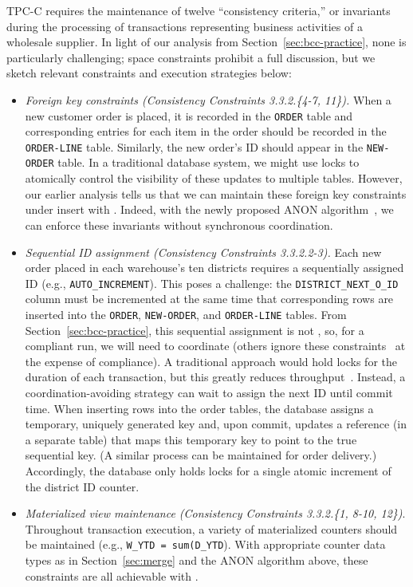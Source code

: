 TPC-C requires the maintenance of twelve ``consistency criteria,'' or
invariants during the processing of transactions representing business
activities of a wholesale supplier. In light of our analysis from
Section~\ref{sec:bcc-practice}, none is particularly challenging;
space constraints prohibit a full discussion, but we sketch relevant
constraints and execution strategies below:
\begin{itemize}

\item \textit{Foreign key constraints (Consistency Constraints
  3.3.2.\{4-7, 11\}).} When a new customer order is placed, it is
  recorded in the \texttt{ORDER} table and corresponding entries for
  each item in the order should be recorded in the \texttt{ORDER-LINE}
  table. Similarly, the new order's ID should appear in the
  \texttt{NEW-ORDER} table. In a traditional database system, we might
  use locks to atomically control the visibility of these updates to
  multiple tables. However, our earlier analysis tells us that we can
  maintain these foreign key constraints under insert with
  \cfreedom. Indeed, with the newly proposed ANON
  algorithm~\cite{ramp-txns}, we can enforce these invariants without
  synchronous coordination.

\item \textit{Sequential ID assignment (Consistency Constraints
  3.3.2.2-3).} Each new order placed in each warehouse's ten districts
  requires a sequentially assigned ID (e.g.,
  \texttt{AUTO\_INCREMENT}). This poses a challenge: the
  \texttt{DISTRICT\_NEXT\_O\_ID} column must be incremented at the
  same time that corresponding rows are inserted into the
  \texttt{ORDER}, \texttt{NEW-ORDER}, and \texttt{ORDER-LINE}
  tables. From Section~\ref{sec:bcc-practice}, this sequential
  assignment is not \cfree, so, for a compliant run, we will need to
  coordinate (others ignore these constraints~\cite{hat-vldb,silo} at
  the expense of compliance). A traditional approach would hold locks
  for the duration of each transaction, but this greatly reduces
  throughput~\cite{abadi-vll}. Instead, a coordination-avoiding
  strategy can wait to assign the next ID until commit time. When
  inserting rows into the order tables, the database assigns a
  temporary, uniquely generated key and, upon commit, updates a
  reference (in a separate table) that maps this temporary key to
  point to the true sequential key. (A similar process can be
  maintained for order delivery.) Accordingly, the database only holds
  locks for a single atomic increment of the district ID counter.

\item \textit{Materialized view maintenance (Consistency Constraints
  3.3.2.\{1, 8-10, 12\})}. Throughout transaction execution, a variety
  of materialized counters should be maintained (e.g., \texttt{W\_YTD
    = sum(D\_YTD}). With appropriate counter data types as in
  Section~\ref{sec:merge} and the ANON algorithm above, these
  constraints are all achievable with \cfreedom.
\end{itemize}

